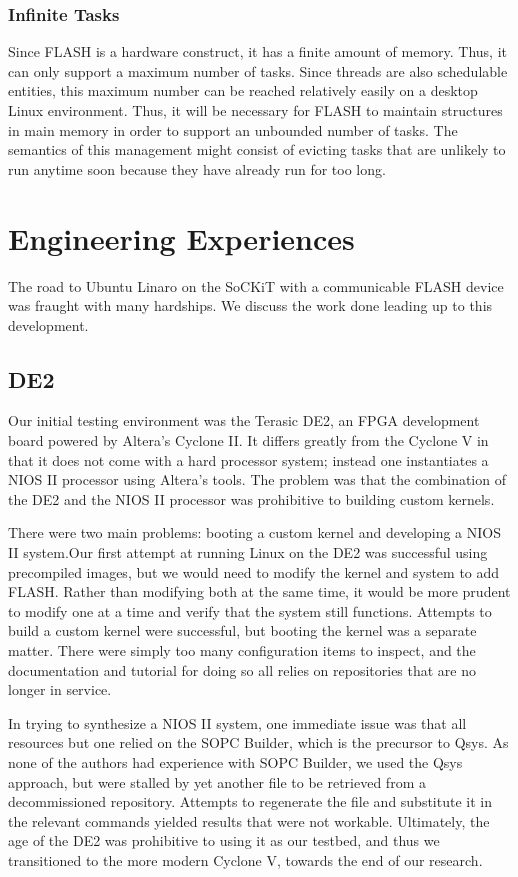 \documentclass{sig-alternate-10pt}
\begin{document}
\subsubsection{Infinite Tasks}
Since FLASH is a hardware construct, it has a finite amount of memory. Thus, it can only support a maximum number of tasks. Since threads are also schedulable entities, this maximum number can be reached relatively easily on a desktop Linux environment. Thus, it will be necessary for FLASH to maintain structures in main memory in order to support an unbounded number of tasks. The semantics of this management might consist of evicting tasks that are unlikely to run anytime soon because they have already run for too long.

\section{Engineering Experiences}
\label{sec:eng_exp}
The road to Ubuntu Linaro on the SoCKiT with a communicable FLASH device was fraught with many hardships. We discuss the work done leading up to this development.
\subsection{DE2}
Our initial testing environment was the Terasic DE2, an FPGA development board powered by Altera's Cyclone II. It differs greatly from the Cyclone V in that it does not come with a hard processor system; instead one instantiates a NIOS II processor using Altera's tools. The problem was that the combination of the DE2 and the NIOS II processor was prohibitive to building custom kernels.

There were two main problems: booting a custom kernel and developing a NIOS II system.Our first attempt at running Linux on the DE2 was successful using precompiled images, but we would need to modify the kernel and system to add FLASH. Rather than modifying both at the same time, it would be more prudent to modify one at a time and verify that the system still functions. Attempts to build a custom kernel were successful, but booting the kernel was a separate matter. There were simply too many configuration items to inspect, and the documentation and tutorial for doing so all relies on repositories that are no longer in service.

In trying to synthesize a NIOS II system, one immediate issue was that all resources but one relied on the SOPC Builder, which is the precursor to Qsys. As none of the authors had experience with SOPC Builder, we used the Qsys approach, but were stalled by yet another file to be retrieved from a decommissioned repository. Attempts to regenerate the file and substitute it in the relevant commands yielded results that were not workable. Ultimately, the age of the DE2 was prohibitive to using it as our testbed, and thus we transitioned to the more modern Cyclone V, towards the end of our research.
\end{document}
